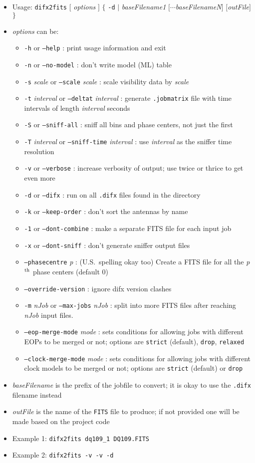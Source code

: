 \begin{itemize}
\item[] Usage: {\tt difx2fits} $[$ {\em options} $]$ $\{$ {\tt -d} $\mid$ {\em baseFilename1} $[\cdots${\em baseFilenameN}$]$ $[${\em outFile}$]$ $\}$
\item[] {\em options} can be:
\begin{itemize}
\item[] {\tt -h} or {\tt --help} : print usage information and exit
\item[] {\tt -n} or {\tt --no-model} : don't write model (ML) table
\item[] {\tt -s} {\em scale} or {\tt --scale} {\em scale} : scale visibility data by {\em scale}
\item[] {\tt -t} {\em interval} or {\tt --deltat} {\em interval} : generate {\tt .jobmatrix} file with time intervals of length {\em interval} seconds
\item[] {\tt -S} or {\tt --sniff-all} : sniff all bins and phase centers, not just the first
\item[] {\tt -T} {\em interval} or {\tt --sniff-time} {\em interval} : use {\em interval} as the sniffer time resolution
\item[] {\tt -v} or {\tt --verbose} : increase verbosity of output; use twice or thrice to get even more
\item[] {\tt -d} or {\tt --difx} : run on all {\tt .difx} files found in the directory
\item[] {\tt -k} or {\tt --keep-order} : don't sort the antennas by name
\item[] {\tt -1} or {\tt --dont-combine} : make a separate FITS file for each input job
\item[] {\tt -x} or {\tt --dont-sniff} : don't generate sniffer output files
\item[] {\tt --phasecentre} {\em p} : (U.S.\ spelling okay too) Create a FITS file for all the {\em p}$^{\rm th}$ phase centers (default 0)
\item[] {\tt --override-version} : ignore difx version clashes
\item[] {\tt -m} {\em nJob} or {\tt --max-jobs} {\em nJob} : split into more FITS files after reaching {\em nJob} input files.
\item[] {\tt --eop-merge-mode} {\em mode} : sets conditions for allowing jobs with different EOPs to be merged or not; options are {\tt strict} (default), {\tt drop}, {\tt relaxed}
\item[] {\tt --clock-merge-mode} {\em mode} : sets conditions for allowing jobs with different clock models to be merged or not; options are {\tt strict} (default) or {\tt drop}
\end{itemize}
\item[] {\em baseFilename} is the prefix of the jobfile to convert; it is okay to use the {\tt .difx} filename instead
\item[] {\em outFile} is the name of the {\tt FITS} file to produce; if not provided one will be made based on the project code
\item[] Example 1: {\tt difx2fits dq109\_1 DQ109.FITS}
\item[] Example 2: {\tt difx2fits -v -v -d}
\end{itemize}

